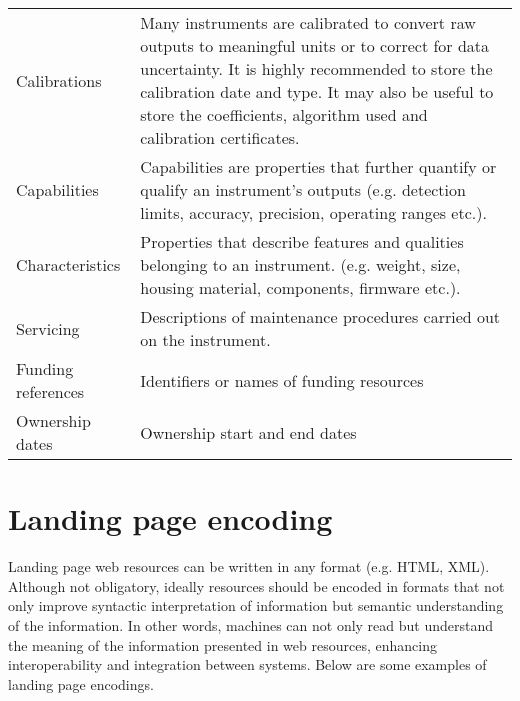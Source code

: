 \documentclass[a4paper,10pt,english]{sphinxmanual}
\begin{document}
\begin{savenotes}\sphinxattablestart
\centering
{}
\sphinxthecaptionisattop
{}\label{\detokenize{white-paper/landing-page-content:id3}}\label{\detokenize{white-paper/landing-page-content:tab-landing-content-events}}
\sphinxaftertopcaption
\begin{tabulary}{\linewidth}[t]{|T|T|}
\hline
\sphinxstyletheadfamily 
{}
&\sphinxstyletheadfamily 
{}
\\
\hline
Calibrations
&
Many instruments are calibrated to convert raw
outputs to meaningful units or to correct for
data uncertainty. It is highly recommended to
store the calibration date and type. It may
also be useful to store the coefficients,
algorithm used and calibration certificates.
\\
\hline
Capabilities
&
Capabilities are properties that further
quantify or qualify an instrument’s outputs
(e.g. detection limits, accuracy, precision,
operating ranges etc.).
\\
\hline
Characteristics
&
Properties that describe features and
qualities belonging to an instrument. (e.g.
weight, size, housing material, components,
firmware etc.).
\\
\hline
Servicing
&
Descriptions of maintenance procedures carried
out on the instrument.
\\
\hline
Funding references
&
Identifiers or names of funding resources
\\
\hline
Ownership dates
&
Ownership start and end dates
\\
\hline
\end{tabulary}
\par
\sphinxattableend\end{savenotes}


\section{Landing page encoding}
\label{\detokenize{white-paper/landing-page-encoding:landing-page-encoding}}\label{\detokenize{white-paper/landing-page-encoding:id1}}\label{\detokenize{white-paper/landing-page-encoding::doc}}
Landing page web resources can be written in any format (e.g. HTML,
XML). Although not obligatory, ideally resources should be encoded in
formats that not only improve syntactic interpretation of information
but semantic understanding of the information. In other words, machines
can not only read but understand the meaning of the information
presented in web resources, enhancing interoperability and integration
between systems. Below are some examples of landing page encodings.
\end{document}
